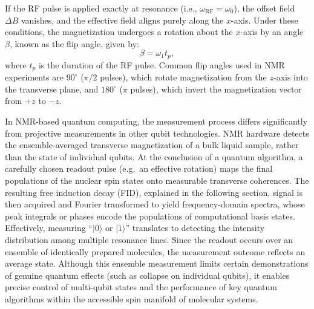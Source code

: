 \documentclass[%
 reprint,
 amsmath,amssymb,
 aps,
]{revtex4-2}
\begin{document}
If the RF pulse is applied exactly at resonance (i.e., $\omega_{\text{RF}} = \omega_0$), the offset field $\Delta B$ vanishes, and the effective field aligns purely along the $x$-axis. Under these conditions, the magnetization undergoes a rotation about the $x$-axis by an angle $\beta$, known as the flip angle, given by:
\[
\beta = \omega_1 t_p,
\]
where $t_p$ is the duration of the RF pulse. Common flip angles used in NMR experiments are $90^\circ$ ($\pi/2$ pulses), which rotate magnetization from the $z$-axis into the transverse plane, and $180^\circ$ ($\pi$ pulses), which invert the magnetization vector from $+z$ to $-z$.

In NMR-based quantum computing, the measurement process differs significantly from projective measurements in other qubit technologies. NMR hardware detects the ensemble-averaged transverse magnetization of a bulk liquid sample, rather than the state of individual qubits. At the conclusion of a quantum algorithm, a carefully chosen readout pulse (e.g.\ an effective rotation) maps the final populations of the nuclear spin states onto measurable transverse coherences. The resulting free induction decay (FID), explained in the following section, signal is then acquired and Fourier transformed to yield frequency-domain spectra, whose peak integrals or phases encode the populations of computational basis states. Effectively, measuring ``$\lvert 0\rangle$ or $\lvert 1\rangle$'' translates to detecting the intensity distribution among multiple resonance lines. Since the readout occurs over an ensemble of identically prepared molecules, the measurement outcome reflects an average state. Although this ensemble measurement limits certain demonstrations of genuine quantum effects (such as collapse on individual qubits), it enables precise control of multi-qubit states and the performance of key quantum algorithms within the accessible spin manifold of molecular systems.



\end{document}
